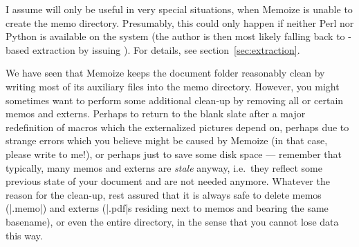 \documentclass[a4paper,11pt]{article}
\begin{document}
{
  \relaxmmzcommands
  \def\mynewextern dirty-house.#1-#2.pdf\relax{%
  }
}

I assume  will only be useful in very special situations,
when Memoize is unable to create the memo directory.  Presumably, this could
only happen if neither Perl nor Python is available on the system (the author
is then most likely falling back to -based extraction by issuing
).  For details, see
section~\ref{sec:extraction}.

We have seen that Memoize keeps the document folder reasonably clean by writing
most of its auxiliary files into the memo directory.  However, you might
sometimes want to perform some additional clean-up by removing all or certain
memos and externs.  Perhaps to return to the blank slate after a major
redefinition of macros which the externalized pictures depend on, perhaps due
to strange errors which you believe might be caused by Memoize (in that case,
please write to me!), or perhaps just to save some disk space --- remember that
typically, many memos and externs are \emph{stale} anyway, i.e.\ they reflect
some previous state of your document and are not needed anymore.  Whatever the
reason for the clean-up, rest assured that it is always safe to delete memos
(|.memo|) and externs (|.pdf|s residing next to memos and bearing the same
basename), or even the entire  directory,
in the sense that you cannot lose data this way.
\end{document}
